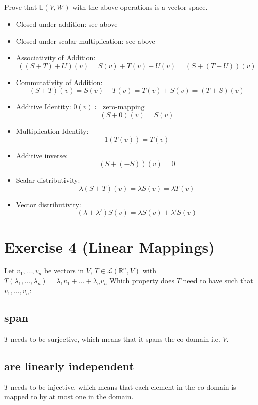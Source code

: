 \documentclass[10pt]{article}
\numberwithin{equation}{section}
\begin{document}
\subsection{}
Prove that $\mathbb{L}(V,W)$ with the above operations is a vector space.\\
\begin{itemize}
\item{Closed under addition: see above}
\item{Closed under scalar multiplication: see above}
\item{Associativity of Addition:
$$((S+T) +U)(v) = S(v) + T(v) + U(v) = (S + (T+U))(v)$$}
\item{Commutativity of Addition:
$$(S+T)(v)=S(v)+T(v)=T(v)+S(v)=(T+S)(v)$$}
\item{Additive Identity: $0(v)\coloneqq \text{zero-mapping}$
$$(S+0)(v) = S(v)$$}
\item{Multiplication Identity: 
$$1(T(v)) = T(v)$$}
\item{Additive inverse:
$$(S+(-S))(v) = 0$$}
\item{Scalar distributivity:
$$\lambda (S + T)(v) = \lambda S(v) = \lambda T(v)$$}
\item{Vector distributivity: 
$$(\lambda + \lambda')S(v) = \lambda S(v) + \lambda' S(v)$$}
\end{itemize}

\section{Exercise 4 (Linear Mappings)}
Let $v_1, \dots, v_n$ be vectors in $V$, $T \in \mathcal{L}(\mathbb{R}^n, V)$ with $T(\lambda_1, \dots, \lambda_n) = \lambda_1 v_1 + \dots + \lambda_n v_n$
Which property does $T$ need to have such that $v_1, \dots, v_n$:
\subsection{span}
$T$ needs to be surjective, which means that it spans the co-domain i.e. $V$.
\subsection{are linearly independent}
$T$ needs to be injective, which means that each element in the co-domain is mapped to by at most one in the domain.
\end{document}
